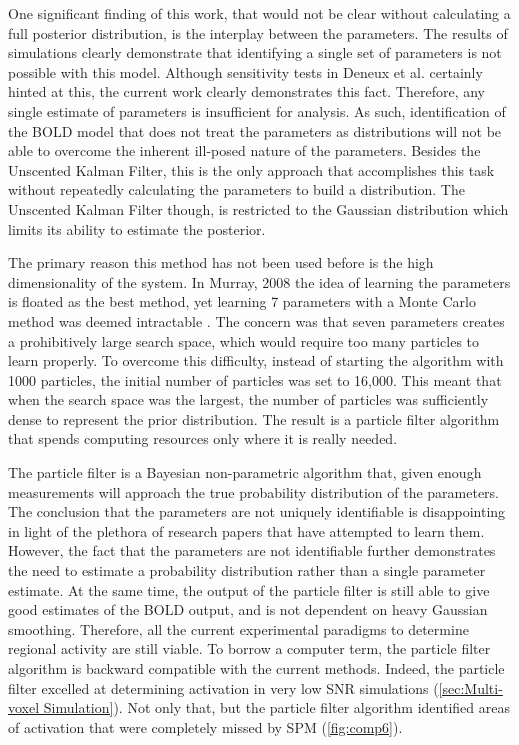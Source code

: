 One significant finding of this work, that would not be clear without
calculating a full posterior distribution, is the interplay
between the parameters. The results of simulations clearly demonstrate
that identifying a single set of parameters is not possible with this
model. Although sensitivity tests in Deneux et al. \cite{Deneux2006} certainly hinted
at this, the current work clearly demonstrates this fact. Therefore,
any single estimate of parameters is insufficient for analysis. As such,
identification of the \ac{BOLD} model that does not treat the parameters as distributions
will not be able to overcome the inherent ill-posed nature of the
parameters. Besides the Unscented Kalman Filter, this is the only approach
that accomplishes this task without repeatedly calculating the parameters
to build a distribution. The Unscented Kalman Filter though, is restricted
to the Gaussian distribution which limits its ability to estimate the posterior.

The primary reason this method has not been used before is the high
dimensionality of the system. In Murray, 2008 the idea of learning
the parameters is floated as the best method, yet
learning 7 parameters with a Monte Carlo method was deemed intractable
\cite{Murray2008}. The
concern was that seven parameters creates a prohibitively large
search space, which would require too many particles to learn properly. To overcome
this difficulty, instead of starting the algorithm with 1000 particles,
the initial number of particles was set to 16,000. This meant that
when the search space was the largest, the number of particles was
sufficiently dense to represent the prior distribution. The result is
a particle filter algorithm that spends computing resources only where
it is really needed.

The particle filter is a Bayesian non-parametric algorithm that, given
enough measurements will approach the true probability distribution
of the parameters. The conclusion that the parameters are not
uniquely identifiable is disappointing in light of the plethora
of research papers that have attempted to learn them. However, the fact
that the parameters are not identifiable further demonstrates
the need to estimate a probability distribution rather than a single
parameter estimate. At the same time, the output of the particle filter
is still able to give good estimates of the \ac{BOLD} output, and is not
dependent on heavy Gaussian smoothing. Therefore, all the current
experimental paradigms to determine regional activity are still viable.
To borrow a computer term, the particle filter algorithm is backward
compatible with the current methods. Indeed, the particle filter excelled
at determining activation in very low \ac{SNR} simulations
(\autoref{sec:Multi-voxel Simulation}). Not only that, but the particle
filter algorithm identified areas of activation that were completely
missed by \ac{SPM} (\autoref{fig:comp6}).

